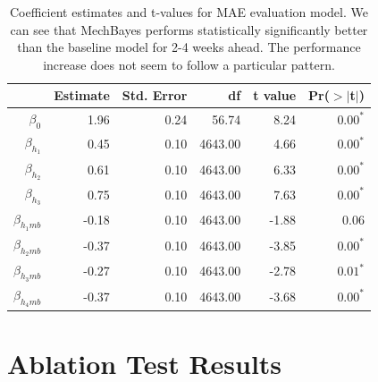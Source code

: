 \documentclass[11pt]{amsart}
\begin{document}
\begin{table}[ht]
\centering
\begin{tabular}{rrrrrr}
  \hline
 & Estimate & Std. Error & df & t value & Pr($>$$|$t$|$) \\ 
  \hline
$\beta_0$  & 1.96 & 0.24 & 56.74 & 8.24 & $0.00^*$ \\ 
 $\beta_{h_1}$  & 0.45 & 0.10 & 4643.00 & 4.66 & $0.00^*$ \\ 
   $\beta_{h_2} $ & 0.61 & 0.10 & 4643.00 & 6.33 & $0.00^*$ \\ 
  $\beta_{h_3}$ & 0.75 & 0.10 & 4643.00 & 7.63 & $0.00^*$ \\ 
$\beta_{h_1 mb}$ & -0.18 & 0.10 & 4643.00 & -1.88 & 0.06 \\ 
  $\beta_{h_2 mb}$& -0.37 & 0.10 & 4643.00 & -3.85 & $0.00^*$ \\ 
  $\beta_{h_3mb}$& -0.27 & 0.10 & 4643.00 & -2.78 & $0.01^*$ \\ 
 $\beta_{h_4mb}$& -0.37 & 0.10 & 4643.00 & -3.68 & $0.00^*$ \\ 
   \hline
\end{tabular}
\caption{Coefficient estimates and t-values for MAE evaluation model. We can see that MechBayes performs statistically significantly better than the baseline model for 2-4 weeks ahead. The performance increase does not seem to follow a particular pattern.}
\end{table}
%
%   
   
   
   \section{Ablation Test Results}
\end{document}
